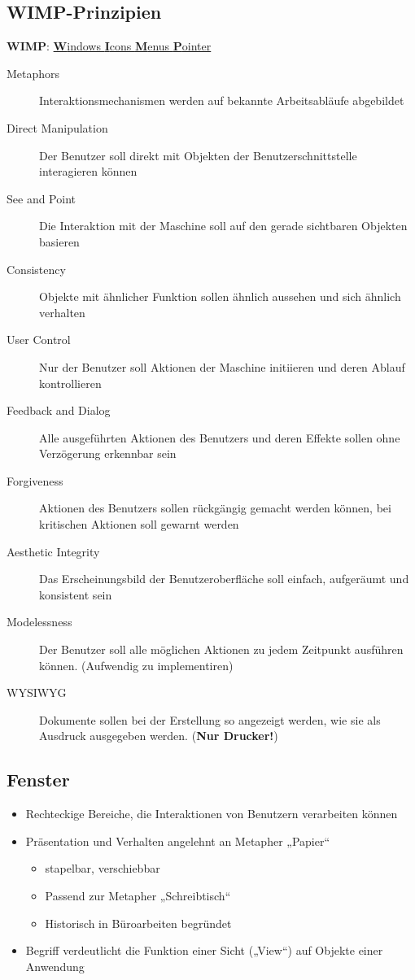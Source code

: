 \documentclass
[
	8pt,		%
	ngerman,	%
	a4paper,	%
	landscape,	%
	final		%
]{extarticle}
\begin{document}
\begin{multicols*}{4}
	\subsection{WIMP-Prinzipien}
	\textbf{WIMP}: \underline{\textbf{W}indows \textbf{I}cons \textbf{M}enus \textbf{P}ointer}
	\begin{description}
		\item[Metaphors] Interaktionsmechanismen werden auf bekannte
		      Arbeitsabläufe abgebildet
		\item[Direct Manipulation] Der Benutzer soll direkt mit Objekten der
		      Benutzerschnittstelle interagieren können
		\item[See and Point] Die Interaktion mit der Maschine soll auf den
		      gerade sichtbaren Objekten basieren
		\item[Consistency] Objekte mit ähnlicher Funktion sollen ähnlich
		      aussehen und sich ähnlich verhalten
		\item [User Control] Nur der Benutzer soll Aktionen der Maschine
		      initiieren und deren Ablauf kontrollieren
		\item [Feedback and Dialog] Alle ausgeführten Aktionen des Benutzers
		      und deren Effekte sollen ohne Verzögerung erkennbar sein
		\item [Forgiveness] Aktionen des Benutzers sollen rückgängig gemacht
		      werden können, bei kritischen Aktionen soll gewarnt werden
		\item [Aesthetic Integrity] Das Erscheinungsbild der Benutzeroberfläche
		      soll einfach, aufgeräumt und konsistent sein
		\item [Modelessness] Der Benutzer soll alle möglichen Aktionen zu jedem
		      Zeitpunkt ausführen können. (Aufwendig zu implementiren)
		\item [WYSIWYG] Dokumente sollen bei der Erstellung so angezeigt werden,
		      wie sie als Ausdruck ausgegeben werden. (\textbf{Nur Drucker!})
	\end{description}
	\subsection{Fenster}
	\begin{itemize}
		\item Rechteckige Bereiche, die Interaktionen von Benutzern verarbeiten
		      können
		\item Präsentation und Verhalten angelehnt an Metapher „Papier“
		      \begin{itemize}[nolistsep]
			      \item stapelbar, verschiebbar
			      \item Passend zur Metapher „Schreibtisch“
			      \item Historisch in Büroarbeiten begründet
		      \end{itemize}
		\item Begriff verdeutlicht die Funktion einer Sicht („View“) auf Objekte
		      einer Anwendung
	\end{itemize}

\end{multicols*}
\end{document}
